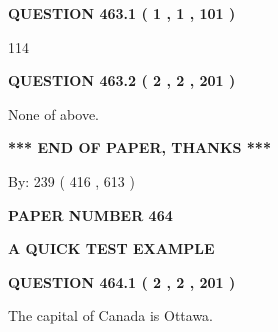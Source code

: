 \documentclass[12pt]{article}
\begin{document}
{\textbf{\Large{QUESTION
463.1 
 ( 1 , 1 , 101 )
}}}
  
  
 
 
\noindent{}

114
 
 
  
\vspace{0.2in}
  
{\textbf{\Large{QUESTION
463.2 
 ( 2 , 2 , 201 )
}}}
  
  
 
 
\noindent{}
 
 
 None of above.
 
 
 
 
   
   
 \vspace{0.2in}
 
   
   
   
   
\vspace{1.0in} 
{\textbf{\large{ *** END OF PAPER, THANKS *** }}} 
   
   
\hspace{1.0in} By: 
 239 ( 416 ,  613 )
   
   
   
   
\newpage 
\setcounter{page}{ 
   464001 } 
   
   
   
   
 {\textbf{ \Large{ PAPER NUMBER  464  }}}
   
   
\vspace{0.2in}
   
   
   
   
   
   
 \vspace{0.2in}
{\LARGE {\textbf{ A QUICK TEST EXAMPLE}}}
   
   
  
\vspace{0.2in}
  
{\textbf{\Large{QUESTION
464.1 
 ( 2 , 2 , 201 )
}}}
  
  
 
 
\noindent{}
 
 
The capital of Canada is Ottawa.
 
\end{document}
